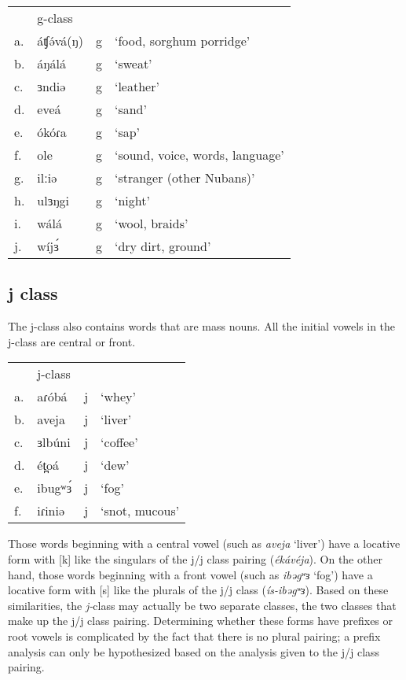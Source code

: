 \ea 	
\begin{tabular}[t]{llll}
&	g-class\\
a.	&	áʧə́vá(ŋ)	&	g	&	‘food, sorghum porridge’\\
b.	&	áŋálá	&	g	&	‘sweat’\\
c.	&	ɜndiə	&	g	&	‘leather’\\
d.	&	eveá	&	g 	&	‘sand’\\
e.	&	ókóɾa	&	g	&	‘sap’\\
f.	&	ole		&	g	&	‘sound, voice, words, language’\\
g.	&	ilːiə	&	g	&	‘stranger (other Nubans)’\\
h.	&	ulɜŋgi	&	g	&	‘night’\\
i.	&	wálá	&	g	&	‘wool, braids’\\
j.	&	wíjɜ́	&	g	&	‘dry dirt, ground’\\
\end{tabular}
\z

\subsection{j class}\label{sec:ch6:j}

The j-class also contains words that are mass nouns. All the initial vowels in the j-class are central or front.

\ea	
\begin{tabular}[t]{llll}
&	j-class\\
a.	&	aɾóbá	&	j	&	‘whey’\\
b.	&	aveja	&	j	&	‘liver’\\
c.	&	ɜlbúni	&	j	&	‘coffee’\\
d.	&	ét̪oá	&	j	&	‘dew’\\
e.	&	ibugʷɜ́	&	j	&	‘fog’\\
f.	&	iɾiniə	&	j	&	‘snot, mucous’\\
\end{tabular}
\z

Those words beginning with a central vowel (such as \textit{aveja} ‘liver’) have a locative form with [k] like the singulars of the j/j class pairing (\textit{ékávéja}). On the other hand, those words beginning with a front vowel (such as \textit{ibəgʷɜ} ‘fog’) have a locative form with [s] like the plurals of the j/j class (\textit{ís-ibəgʷɜ}).  Based on these similarities, the \textit{j-}class may actually be two separate classes, the two classes that make up the j/j class pairing. Determining whether these forms have prefixes or root vowels is complicated by the fact that there is no plural pairing; a prefix analysis can only be hypothesized based on the analysis given to the j/j class pairing. 

